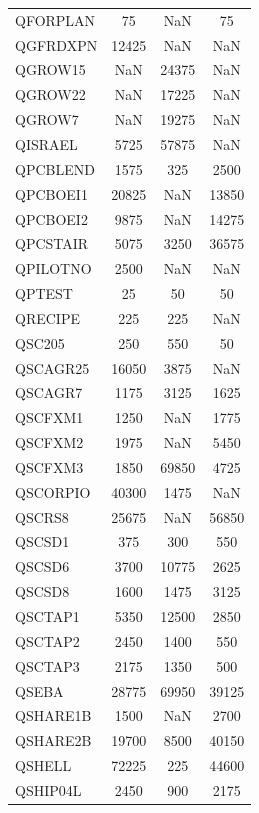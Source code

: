 \begin{longtable}{lccc}
QFORPLAN &       75 &   NaN &       75 \\
QGFRDXPN &    12425 &   NaN &      NaN \\
QGROW15  &      NaN & 24375 &      NaN \\
QGROW22  &      NaN & 17225 &      NaN \\
QGROW7   &      NaN & 19275 &      NaN \\
QISRAEL  &     5725 & 57875 &      NaN \\
QPCBLEND &     1575 &   325 &     2500 \\
QPCBOEI1 &    20825 &   NaN &    13850 \\
QPCBOEI2 &     9875 &   NaN &    14275 \\
QPCSTAIR &     5075 &  3250 &    36575 \\
QPILOTNO &     2500 &   NaN &      NaN \\
QPTEST   &       25 &    50 &       50 \\
QRECIPE  &      225 &   225 &      NaN \\
QSC205   &      250 &   550 &       50 \\
QSCAGR25 &    16050 &  3875 &      NaN \\
QSCAGR7  &     1175 &  3125 &     1625 \\
QSCFXM1  &     1250 &   NaN &     1775 \\
QSCFXM2  &     1975 &   NaN &     5450 \\
QSCFXM3  &     1850 & 69850 &     4725 \\
QSCORPIO &    40300 &  1475 &      NaN \\
QSCRS8   &    25675 &   NaN &    56850 \\
QSCSD1   &      375 &   300 &      550 \\
QSCSD6   &     3700 & 10775 &     2625 \\
QSCSD8   &     1600 &  1475 &     3125 \\
QSCTAP1  &     5350 & 12500 &     2850 \\
QSCTAP2  &     2450 &  1400 &      550 \\
QSCTAP3  &     2175 &  1350 &      500 \\
QSEBA    &    28775 & 69950 &    39125 \\
QSHARE1B &     1500 &   NaN &     2700 \\
QSHARE2B &    19700 &  8500 &    40150 \\
QSHELL   &    72225 &   225 &    44600 \\
QSHIP04L &     2450 &   900 &     2175 \\

\end{longtable}
